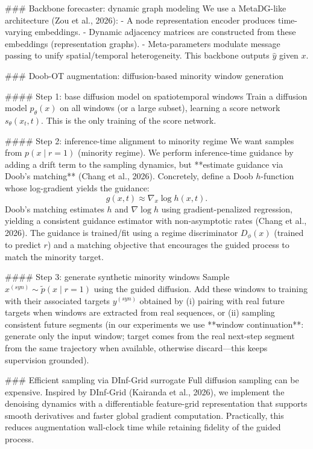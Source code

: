 ### Backbone forecaster: dynamic graph modeling  
We use a MetaDG-like architecture (Zou et al., 2026):  
- A node representation encoder produces time-varying embeddings.  
- Dynamic adjacency matrices are constructed from these embeddings (representation graphs).  
- Meta-parameters modulate message passing to unify spatial/temporal heterogeneity.  
This backbone outputs \(\hat{y}\) given \(x\).

### Doob-OT augmentation: diffusion-based minority window generation  

#### Step 1: base diffusion model on spatiotemporal windows  
Train a diffusion model \(p_\theta(x)\) on all windows (or a large subset), learning a score network \(s_\theta(x_t,t)\). This is the only training of the score network.

#### Step 2: inference-time alignment to minority regime  
We want samples from \(p(x \mid r=1)\) (minority regime). We perform inference-time guidance by adding a drift term to the sampling dynamics, but **estimate guidance via Doob’s matching** (Chang et al., 2026). Concretely, define a Doob \(h\)-function whose log-gradient yields the guidance:
\[
g(x,t) \approx \nabla_x \log h(x,t).
\]
Doob’s matching estimates \(h\) and \(\nabla \log h\) using gradient-penalized regression, yielding a consistent guidance estimator with non-asymptotic rates (Chang et al., 2026). The guidance is trained/fit using a regime discriminator \(D_\phi(x)\) (trained to predict \(r\)) and a matching objective that encourages the guided process to match the minority target.

#### Step 3: generate synthetic minority windows  
Sample \(x^{(syn)} \sim \tilde{p}(x \mid r=1)\) using the guided diffusion. Add these windows to training with their associated targets \(y^{(syn)}\) obtained by (i) pairing with real future targets when windows are extracted from real sequences, or (ii) sampling consistent future segments (in our experiments we use **window continuation**: generate only the input window; target comes from the real next-step segment from the same trajectory when available, otherwise discard—this keeps supervision grounded).

### Efficient sampling via DInf-Grid surrogate  
Full diffusion sampling can be expensive. Inspired by DInf-Grid (Kairanda et al., 2026), we implement the denoising dynamics with a differentiable feature-grid representation that supports smooth derivatives and faster global gradient computation. Practically, this reduces augmentation wall-clock time while retaining fidelity of the guided process.

